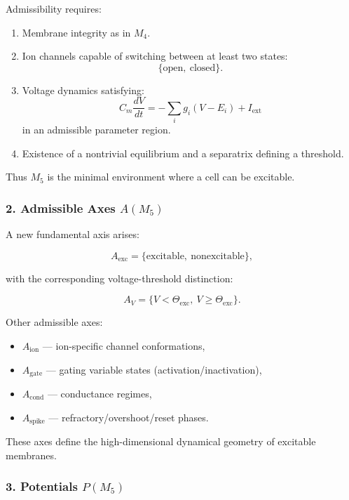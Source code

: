 Admissibility requires:

\begin{enumerate}
    \item Membrane integrity as in $M_4$.
    \item Ion channels capable of switching between at least two states:
          \[
          \{ \text{open},\ \text{closed} \}.
          \]
    \item Voltage dynamics satisfying:
          \[
          C_m \frac{dV}{dt} = - \sum_i g_i (V - E_i) + I_{\mathrm{ext}}
          \]
          in an admissible parameter region.
    \item Existence of a nontrivial equilibrium and a separatrix defining a
          threshold.
\end{enumerate}

Thus $M_5$ is the minimal environment where a cell can be excitable.

\subsubsection*{2. Admissible Axes \texorpdfstring{$A(M_5)$}{A(M_5)}}

A new fundamental axis arises:

\[
A_{\mathrm{exc}} = \{ \text{excitable},\ \text{nonexcitable} \},
\]

with the corresponding voltage-threshold distinction:

\[
A_V = \{ V < \Theta_{\mathrm{exc}},\ V \ge \Theta_{\mathrm{exc}} \}.
\]

Other admissible axes:

\begin{itemize}
    \item $A_{\mathrm{ion}}$ — ion-specific channel conformations,
    \item $A_{\mathrm{gate}}$ — gating variable states (activation/inactivation),
    \item $A_{\mathrm{cond}}$ — conductance regimes,
    \item $A_{\mathrm{spike}}$ — refractory/overshoot/reset phases.
\end{itemize}

These axes define the high-dimensional dynamical geometry of excitable membranes.

\subsubsection*{3. Potentials \texorpdfstring{$P(M_5)$}{P(M_5)}}

